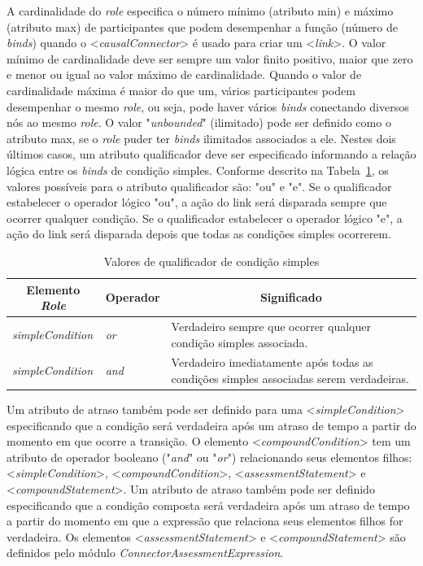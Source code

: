 A cardinalidade do \textit{role} especifica o número mínimo (atributo min) e máximo (atributo max) de participantes que podem desempenhar a função (número de \textit{binds}) quando o <\textit{causalConnector}> é usado para criar um <\textit{link}>. O valor mínimo de cardinalidade deve ser sempre um valor finito positivo, maior que zero e menor ou igual ao valor máximo de cardinalidade. Quando o valor de cardinalidade máxima é maior do que um, vários participantes podem desempenhar o mesmo \textit{role}, ou seja, pode haver vários \textit{binds} conectando diversos nós ao mesmo \textit{role}. O valor "\textit{unbounded}" (ilimitado) pode ser definido como o atributo max, se o \textit{role} puder ter \textit{binds} ilimitados associados a ele. Nestes dois últimos casos, um atributo qualificador deve ser especificado informando a relação lógica entre os \textit{binds} de condição simples. Conforme descrito na Tabela~\ref{tab:condSimples}, os valores possíveis para o atributo qualificador são: "ou" e "e". Se o qualificador estabelecer o operador lógico "ou", a ação do link será disparada sempre que ocorrer qualquer condição. Se o qualificador estabelecer o operador lógico "e", a ação do link será disparada depois que todas as condições simples ocorrerem.

\begin{table}[!ht] \footnotesize
\caption{Valores de qualificador de condição simples\cite{ITU:2009ma}}
\label{tab:condSimples}
\centering
{
 \renewcommand\arraystretch{1.0}
 \begin{tabular}{|p{2.5cm}|p{0.8cm}|p{11cm}|} \hline
  \multicolumn{1}{|c|}{Elemento \textit{Role}} & \multicolumn{1}{c|}{Operador} & \multicolumn{1}{c|}{Significado} \\\hline 
    \textit{simpleCondition} & \textit{or} & Verdadeiro sempre que ocorrer qualquer condição simples associada. \\\hline
    \textit{simpleCondition} & \textit{and} & Verdadeiro imediatamente após todas as condições simples associadas serem verdadeiras.\\\hline
  \end{tabular}
}
\end{table}

Um atributo de atraso também pode ser definido para uma <\textit{simpleCondition}> especificando que a condição será verdadeira após um atraso de tempo a partir do momento em que ocorre a transição. O elemento <\textit{compoundCondition}> tem um atributo de operador booleano ("\textit{and}" ou "\textit{or}") relacionando seus elementos filhos: <\textit{simpleCondition}>, <\textit{compoundCondition}>, <\textit{assessmentStatement}> e <\textit{compoundStatement}>. Um atributo de atraso também pode ser definido especificando que a condição composta será verdadeira após um atraso de tempo a partir do momento em que a expressão que relaciona seus elementos filhos for verdadeira. Os elementos <\textit{assessmentStatement}> e <\textit{compoundStatement}> são definidos pelo módulo \textit{ConnectorAssessmentExpression}.

